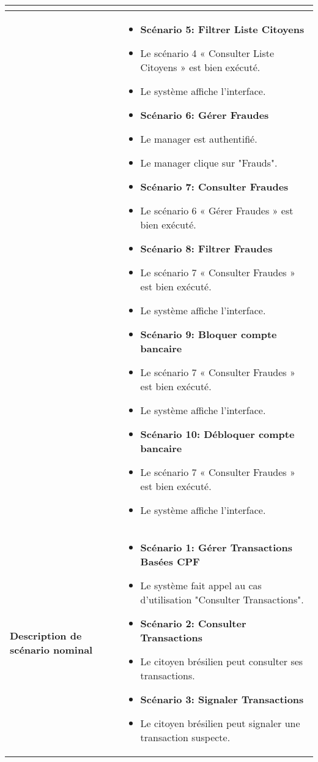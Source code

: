 \begin{longtable}{|>{\arraybackslash}p{4.2cm}|>{\arraybackslash}p{12.5cm}|}
\begin{itemize}[label=]
\end{itemize} \\
\hline
\textbf{}&
\begin{itemize}[label=]
  \item\textbf{Scénario 5: Filtrer Liste Citoyens}
  \item Le scénario 4 « Consulter Liste Citoyens » est bien exécuté.
  \item Le système affiche l'interface.
  \item\textbf{Scénario 6: Gérer Fraudes}
  \item Le manager est authentifié.
  \item Le manager clique sur "Frauds".
   \item\textbf{Scénario 7: Consulter Fraudes}
  \item Le scénario 6 « Gérer Fraudes » est bien exécuté.
   \item\textbf{Scénario 8: Filtrer Fraudes}
   \item Le scénario 7 « Consulter Fraudes » est bien exécuté.
    \item Le système affiche l'interface.
   \item\textbf{Scénario 9: Bloquer compte bancaire}
   \item Le scénario 7 « Consulter Fraudes » est bien exécuté.
   \item Le système affiche l'interface.
   \item\textbf{Scénario 10: Débloquer compte bancaire}
   \item Le scénario 7 « Consulter Fraudes » est bien exécuté.
    \item Le système affiche l'interface.
\end{itemize}\\
\hline
\textbf{Description de scénario nominal}&
\begin{itemize}[label=]
  \item\textbf{Scénario 1: Gérer Transactions Basées CPF}
  \item Le système fait appel au cas d'utilisation "Consulter Transactions".
  \item\textbf{Scénario 2: Consulter Transactions}
  \item Le citoyen brésilien peut consulter ses transactions.
  \item\textbf{Scénario 3: Signaler Transactions}
  \item Le citoyen brésilien peut signaler une transaction suspecte.
\end{itemize}
\hline






\end{longtable}

